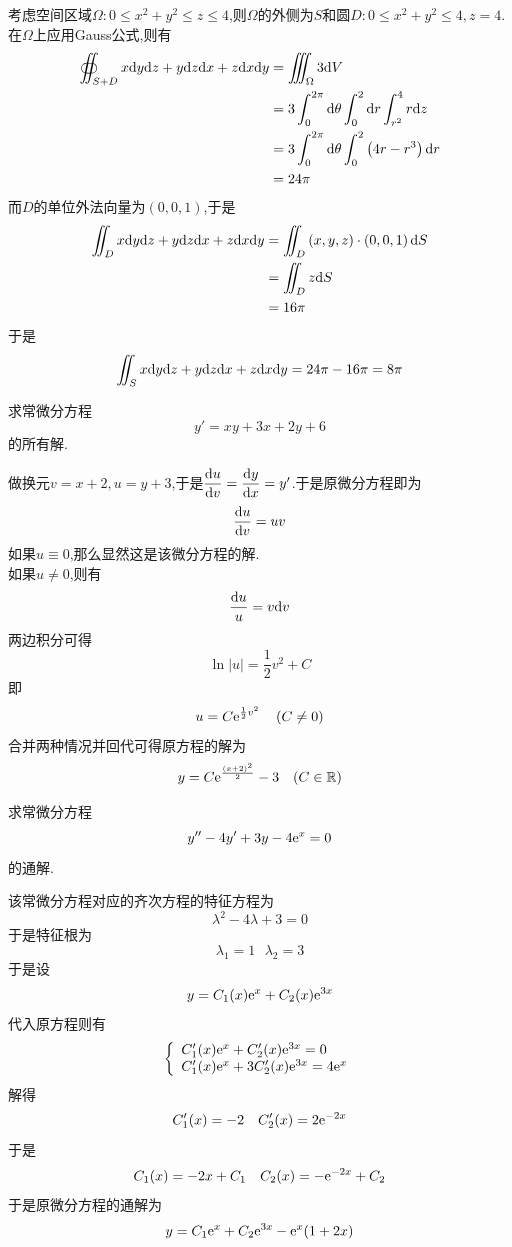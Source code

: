 \documentclass{ctexart}
\begin{document}
\begin{solution}
    考虑空间区域$\Omega:0\leqslant x^2+y^2\leqslant z\leqslant 4$,则$\Omega$的外侧为$S$和圆$D:0\leqslant x^2+y^2\leqslant 4,z=4$.\\
    在$\Omega$上应用Gauss公式,则有
    \[\begin{aligned}
        \oiint_{S+D}x\mathrm{d} y\mathrm{d} z+y\mathrm{d} z\mathrm{d} x+z\mathrm{d} x\mathrm{d} y
        &= \iiint_{\Omega}3\mathrm{d} V \\
        &= 3\int_0^{2\pi}\mathrm{d}\theta\int_0^2\mathrm{d} r\int_{r^2}^4r\mathrm{d} z \\
        &= 3\int_0^{2\pi}\mathrm{d}\theta\int_0^2\left(4r-r^3\right)\mathrm{d} r \\
        &= 24\pi
    \end{aligned}\]
    而$D$的单位外法向量为$(0,0,1)$,于是
    \[\begin{aligned}
        \iint_Dx\mathrm{d} y\mathrm{d} z+y\mathrm{d} z\mathrm{d} x+z\mathrm{d} x\mathrm{d} y
        &= \iint_D\left(x,y,z\right)\cdot\left(0,0,1\right)\mathrm{d} S \\
        &= \iint_Dz\mathrm{d} S \\
        &= 16\pi
    \end{aligned}\]
    于是
    \[\iint_Sx\mathrm{d} y\mathrm{d} z+y\mathrm{d} z\mathrm{d} x+z\mathrm{d} x\mathrm{d} y=24\pi-16\pi=8\pi\]
\end{solution}
\begin{problem}[6.(10\songti{分})]
    求常微分方程
    \[y'=xy+3x+2y+6\]
    的所有解.
\end{problem}
\begin{solution}
    做换元$v=x+2,u=y+3$,于是$\dfrac{\mathrm{d} u}{\mathrm{d} v}=\dfrac{\mathrm{d} y}{\mathrm{d} x}=y'$.于是原微分方程即为
    \[\dfrac{\mathrm{d} u}{\mathrm{d} v}=uv\]
    如果$u\equiv0$,那么显然这是该微分方程的解.\\
    如果$u\neq0$,则有
    \[\dfrac{\mathrm{d} u}{u}=v\mathrm{d} v\]
    两边积分可得
    \[\ln\left|u\right|=\dfrac12v^2+C\]
    即
    \[u=C\e^{\frac12v^2}\ \ \ \left(C\neq0\right)\]
    合并两种情况并回代可得原方程的解为
    \[y=C\e^{\frac{(x+2)^2}{2}}-3\ \ \ (C\in\R)\]

\end{solution}
\begin{problem}[7.(15\songti{分})]
    求常微分方程
    \[y''-4y'+3y-4\mathrm{e}^x=0\]
    的通解.
\end{problem}
\begin{solution}
    该常微分方程对应的齐次方程的特征方程为
    \[\lambda^2-4\lambda+3=0\]
    于是特征根为
    \[\lambda_1=1\ \ \ \lambda_2=3\]
    于是设
    \[y=C_1(x)\mathrm{e}^x+C_2(x)\mathrm{e}^{3x}\]
    代入原方程则有
    \[\left\{\begin{array}{l}
        C_1'(x)\mathrm{e}^x+C_2'(x)\mathrm{e}^{3x}=0\\
        C_1'(x)\mathrm{e}^x+3C_2'(x)\mathrm{e}^{3x}=4\mathrm{e}^x
    \end{array}\right.\]
    解得
    \[C_1'(x)=-2\ \ \ C_2'(x)=2\mathrm{e}^{-2x}\]
    于是
    \[C_1(x)=-2x+C_1\ \ \ C_2(x)=-\e^{-2x}+C_2\]
    于是原微分方程的通解为
    \[y=C_1\mathrm{e}^x+C_2\mathrm{e}^{3x}-\mathrm{e}^x(1+2x)\]
\end{solution}
\end{document}
